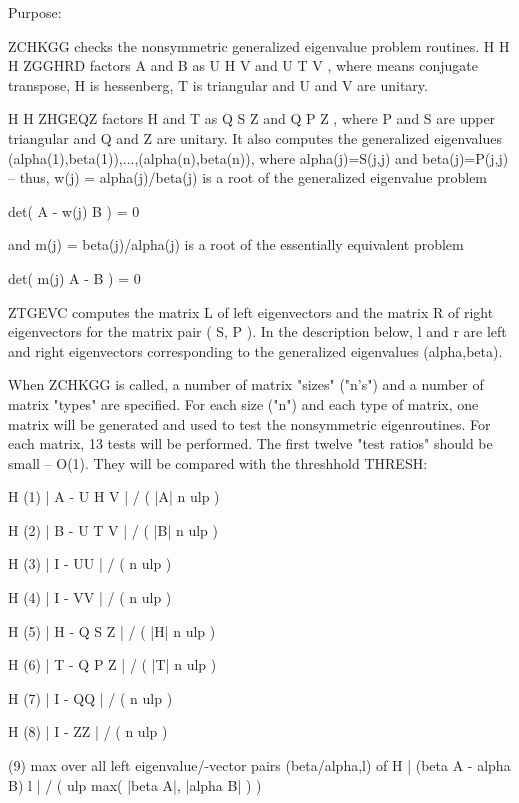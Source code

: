 \begin{DoxyParagraph}{Purpose\+: }
\begin{DoxyVerb} ZCHKGG  checks the nonsymmetric generalized eigenvalue problem
 routines.
                                H          H        H
 ZGGHRD factors A and B as U H V  and U T V , where   means conjugate
 transpose, H is hessenberg, T is triangular and U and V are unitary.

                                 H          H
 ZHGEQZ factors H and T as  Q S Z  and Q P Z , where P and S are upper
 triangular and Q and Z are unitary.  It also computes the generalized
 eigenvalues (alpha(1),beta(1)),...,(alpha(n),beta(n)), where
 alpha(j)=S(j,j) and beta(j)=P(j,j) -- thus, w(j) = alpha(j)/beta(j)
 is a root of the generalized eigenvalue problem

     det( A - w(j) B ) = 0

 and m(j) = beta(j)/alpha(j) is a root of the essentially equivalent
 problem

     det( m(j) A - B ) = 0

 ZTGEVC computes the matrix L of left eigenvectors and the matrix R
 of right eigenvectors for the matrix pair ( S, P ).  In the
 description below,  l and r are left and right eigenvectors
 corresponding to the generalized eigenvalues (alpha,beta).

 When ZCHKGG is called, a number of matrix "sizes" ("n's") and a
 number of matrix "types" are specified.  For each size ("n")
 and each type of matrix, one matrix will be generated and used
 to test the nonsymmetric eigenroutines.  For each matrix, 13
 tests will be performed.  The first twelve "test ratios" should be
 small -- O(1).  They will be compared with the threshhold THRESH:

                  H
 (1)   | A - U H V  | / ( |A| n ulp )

                  H
 (2)   | B - U T V  | / ( |B| n ulp )

               H
 (3)   | I - UU  | / ( n ulp )

               H
 (4)   | I - VV  | / ( n ulp )

                  H
 (5)   | H - Q S Z  | / ( |H| n ulp )

                  H
 (6)   | T - Q P Z  | / ( |T| n ulp )

               H
 (7)   | I - QQ  | / ( n ulp )

               H
 (8)   | I - ZZ  | / ( n ulp )

 (9)   max over all left eigenvalue/-vector pairs (beta/alpha,l) of
                           H
       | (beta A - alpha B) l | / ( ulp max( |beta A|, |alpha B| ) )


\end{DoxyVerb}
\end{DoxyParagraph}
